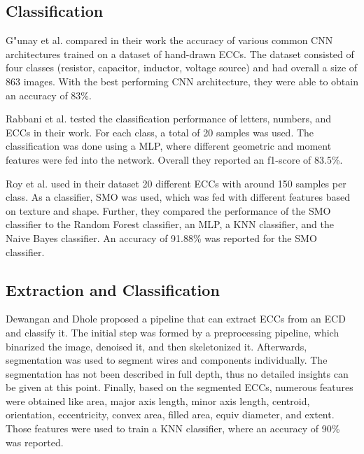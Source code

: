 \subsection{Classification}
\label{sec:rel_classification}

G"unay et al. \cite{ecd_basecnn} compared in their work the accuracy of various common \ac{CNN} architectures trained on a dataset of hand-drawn \acp{ECC}.
The dataset consisted of four classes (resistor, capacitor, inductor, voltage source) and had overall a size of 863 images.
With the best performing \ac{CNN} architecture, they were able to obtain an accuracy of 83\%.

Rabbani et al. \cite{ecd_anngeo} tested the classification performance of letters, numbers, and \acp{ECC} in their work.
For each class, a total of 20 samples was used.
The classification was done using a \ac{MLP}, where different geometric and moment features were fed into the network.
Overall they reported an f1-score of 83.5\%.

Roy et al. \cite{ecd_texturesmo} used in their dataset 20 different \acp{ECC} with around 150 samples per class.
As a classifier, \ac{SMO} was used, which was fed with different features based on texture and shape.
Further, they compared the performance of the \ac{SMO} classifier to the Random Forest classifier, an \ac{MLP}, a \ac{KNN} classifier, and the Naive Bayes classifier.
An accuracy of 91.88\% was reported for the \ac{SMO} classifier.


\subsection{Extraction and Classification}
\label{sec:rel_extract_classification}

Dewangan and Dhole \cite{ecd_knn_recog} proposed a pipeline that can extract \acp{ECC} from an \ac{ECD} and classify it.
The initial step was formed by a preprocessing pipeline, which binarized the image, denoised it, and then skeletonized it.
Afterwards, segmentation was used to segment wires and components individually.
The segmentation has not been described in full depth, thus no detailed insights can be given at this point.
Finally, based on the segmented \acp{ECC}, numerous features were obtained like area, major axis length, minor axis length, centroid, orientation, eccentricity, convex area, filled area, equiv diameter, and extent.
Those features were used to train a \ac{KNN} classifier, where an accuracy of 90\% was reported.

